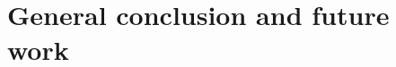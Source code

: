 
\chapter{General conclusion and future work}  %

\ifpdf
    \graphicspath{{Chapter10/Figs/Raster/}{Chapter10/Figs/PDF/}{Chapter10/Figs/}}
\else
    \graphicspath{{Chapter10/Figs/Vector/}{Chapter10/Figs/}}
\fi






